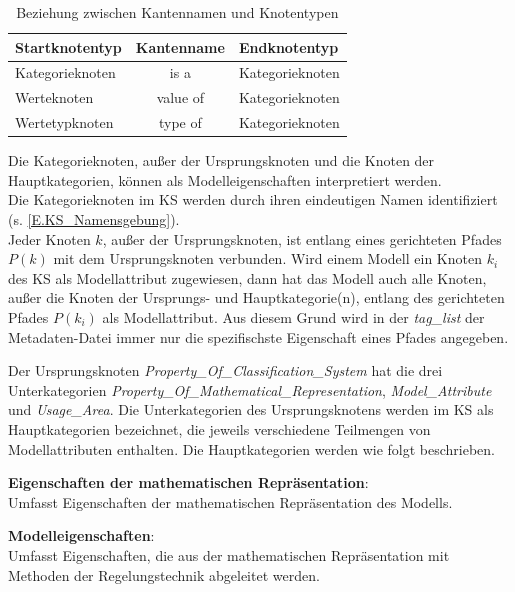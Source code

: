 \begin{table}[H]
	\centering
	\begin{tabular}{l|c|l}
		Startknotentyp & Kantenname & Endknotentyp \\ \hline
		Kategorieknoten & is a & Kategorieknoten \\
		Werteknoten & value of & Kategorieknoten \\
		Wertetypknoten & type of & Kategorieknoten 
	\end{tabular}
	\caption{Beziehung zwischen Kantennamen und Knotentypen}
	\label{table:KS_KantenUndKnoten}
\end{table}
%
Die Kategorieknoten, außer der Ursprungsknoten und die Knoten der Hauptkategorien, können als Modelleigenschaften interpretiert werden. \\
Die Kategorieknoten im KS werden durch ihren eindeutigen Namen identifiziert (s. \ref{E.KS_Namensgebung}).\\
Jeder Knoten $k$, außer der Ursprungsknoten, ist entlang eines gerichteten Pfades $P(k)$ mit dem Ursprungsknoten verbunden. Wird einem Modell ein Knoten $k_i$ des KS als Modellattribut zugewiesen, dann hat das Modell auch alle Knoten, außer die Knoten der Ursprungs- und Hauptkategorie(n), entlang des gerichteten Pfades $P(k_i)$ als Modellattribut. Aus diesem Grund wird in der \textit{tag\_list} der Metadaten-Datei immer nur die spezifischste Eigenschaft eines Pfades angegeben. %

Der Ursprungsknoten \textit{Property\_Of\_Classification\_System} hat die drei Unterkategorien \textit{Property\_Of\_Mathematical\_Representation}, \textit{Model\_Attribute} und \textit{Usage\_Area}. Die Unterkategorien des Ursprungsknotens werden im KS als Hauptkategorien bezeichnet, die jeweils verschiedene Teilmengen von Modellattributen enthalten. Die Hauptkategorien werden wie folgt beschrieben.

\textbf{Eigenschaften der mathematischen Repräsentation}: \\
Umfasst Eigenschaften der mathematischen Repräsentation des Modells.   %

\textbf{Modelleigenschaften}: \\ %
Umfasst Eigenschaften, die aus der mathematischen Repräsentation mit Methoden der Regelungstechnik abgeleitet werden.

